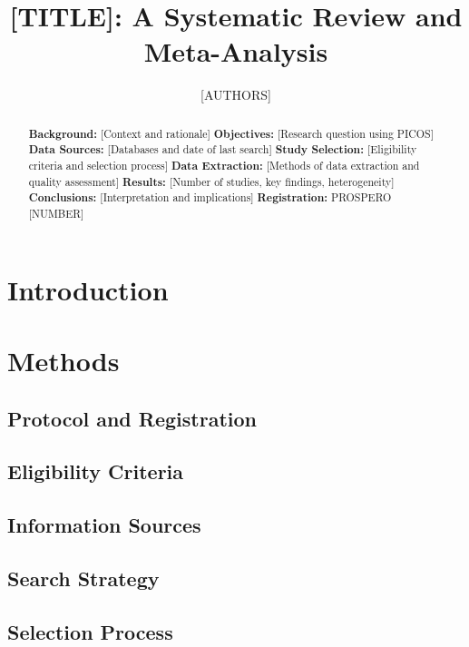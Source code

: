 \documentclass[12pt]{article}
\title{[TITLE]: A Systematic Review and Meta-Analysis}
\author{[AUTHORS]}
\date{}
\begin{document}
\maketitle

\begin{abstract}
\textbf{Background:} [Context and rationale]
\textbf{Objectives:} [Research question using PICOS]
\textbf{Data Sources:} [Databases and date of last search]
\textbf{Study Selection:} [Eligibility criteria and selection process]
\textbf{Data Extraction:} [Methods of data extraction and quality assessment]
\textbf{Results:} [Number of studies, key findings, heterogeneity]
\textbf{Conclusions:} [Interpretation and implications]
\textbf{Registration:} PROSPERO [NUMBER]
\end{abstract}

\section{Introduction}

\section{Methods}

\subsection{Protocol and Registration}

\subsection{Eligibility Criteria}

\subsection{Information Sources}

\subsection{Search Strategy}

\subsection{Selection Process}
\end{document}
